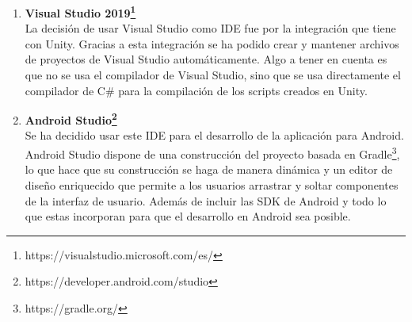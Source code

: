 \begin{enumerate}
Unity ha sido el entorno de desarrollo elegido, la versi\'on de Unity utilizada ha sido la 2018.4.18f1. La elecci\'on de Unity fue por la gran comunidad de usuarios y la extensa y detallada documentaci\'on con la que cuenta este motor. Adem\'as, al usar C\# como lenguaje de programaci\'on, se ha contado con toda la API y documentaci\'on de Microsoft sobre .NET.\footnote{https://docs.microsoft.com/es-es/dotnet/} 

\item \textbf{Visual Studio 2019\footnote{https://visualstudio.microsoft.com/es/}}\\

La decisi\'on de usar Visual Studio como IDE fue por la integraci\'on que tiene con Unity. Gracias a esta integraci\'on se ha podido crear y mantener archivos de proyectos de Visual Studio autom\'aticamente. Algo a tener en cuenta es que no se usa el compilador de Visual Studio, sino que se usa directamente el compilador de C\# para la compilaci\'on de los scripts creados en Unity.\\

\item \textbf{Android Studio\footnote{https://developer.android.com/studio}}\\

Se ha decidido usar este IDE para el desarrollo de la aplicaci\'on para Android. Android Studio dispone de una construcci\'on del proyecto basada en Gradle\footnote{https://gradle.org/}, lo que hace que su construcci\'on se haga de manera din\'amica y un editor de dise\~no enriquecido que permite a los usuarios arrastrar y soltar componentes de la interfaz de usuario.
Adem\'as de incluir las SDK de Android y todo lo que estas incorporan para que el desarrollo en Android sea posible.
\\
\end{enumerate}



